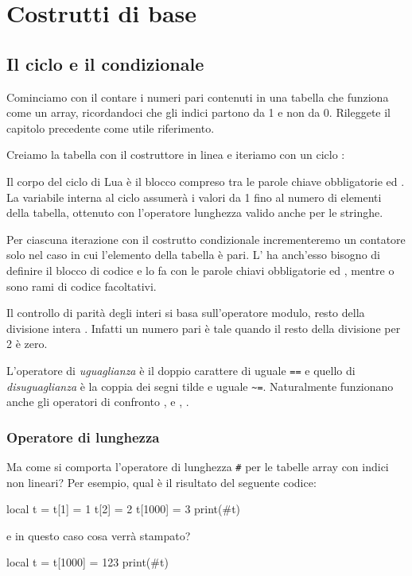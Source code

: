 

\chapter{Costrutti di base}

\section{Il ciclo  e il condizionale }
\label{secFondCicloIf}

Cominciamo con il contare i numeri pari contenuti in una tabella che funziona
come un array, ricordandoci che gli indici partono da 1 e non da 0. Rileggete
il capitolo precedente come utile riferimento.

Creiamo la tabella con il costruttore in linea e iteriamo con un ciclo
:

Il corpo del ciclo  di Lua è il blocco compreso tra le parole chiave
obbligatorie  ed . La variabile  interna al ciclo
assumerà i valori da 1 fino al numero di elementi della tabella, ottenuto con
l'operatore lunghezza \key{\#} valido anche per le stringhe.

Per ciascuna iterazione con il costrutto condizionale  incrementeremo un
contatore solo nel caso in cui l'elemento della tabella è pari. L' ha
anch'esso bisogno di definire il blocco di codice e lo fa con le parole chiavi
obbligatorie  ed , mentre  o  sono rami
di codice facoltativi.

Il controllo di parità degli interi si basa sull'operatore modulo, resto della
divisione intera \key{\%}. Infatti un numero pari è tale quando il resto della
divisione per 2 è zero. 

L'operatore di \emph{uguaglianza} è il doppio carattere di uguale \texttt{==} e
quello di \emph{disuguaglianza} è la coppia dei segni tilde e uguale
\verb|~=|. Naturalmente funzionano anche gli operatori di confronto \key{>},
\key{>=} e \key{<}, \key{<=}.


\subsection{Operatore di lunghezza}

Ma come si comporta l'operatore di lunghezza \texttt{\#} per le tabelle array
con indici non lineari? Per esempio, qual è il risultato del seguente codice:
\begin{lines}
local t = {}
t[1] = 1
t[2] = 2
t[1000] = 3
print(#t)
\end{lines}
e in questo caso cosa verrà stampato?
\begin{lines}
local t = {}
t[1000] = 123
print(#t)
\end{lines}

